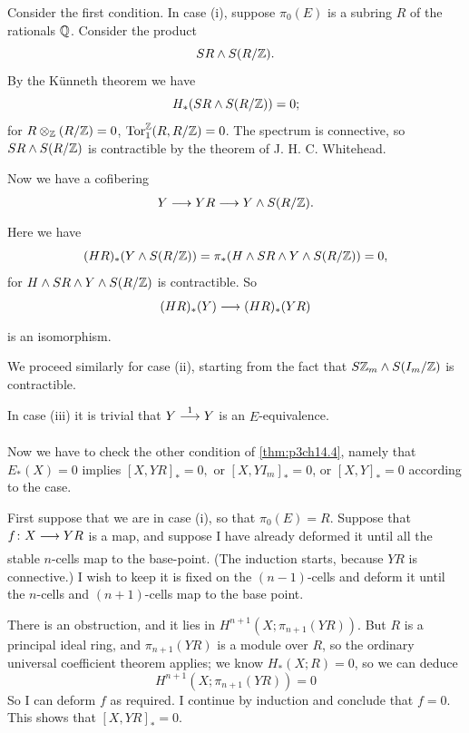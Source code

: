 \documentclass[../main]{subfiles}
\begin{document}
Consider the first condition. In case (i), suppose $\pi_{0}(E)$ is a subring $R$ of the rationals $\mathbb{Q}$. Consider the product 
 \[
  SR \wedge S(R/\mathbb{Z}).
\] 
By the K\"unneth theorem we have 
\[
  H_{\ast}(SR \wedge S(R/\mathbb{Z}))=0;
\] 
for $R \otimes_{\mathbb{Z}}(R/\mathbb{Z})=0$, $\mathrm{Tor}^{\mathbb{Z}}_{1}(R,R/\mathbb{Z})=0$. The spectrum is connective, so $SR \wedge S(R/\mathbb{Z})$ is contractible by the theorem of J. H. C. Whitehead.

Now we have a cofibering 
\[
  Y \lar{} YR \lar{} Y \wedge S(R/\bZ).
\] 
Here we have 
\[
  (HR)_{\ast}(Y \wedge S(R/\mathbb{Z}))=\pi_{\ast}(H \wedge SR \wedge Y \wedge S(R/\mathbb{Z}))=0,
\] 
for $H \wedge SR \wedge Y \wedge S(R/\mathbb{Z})$ is contractible. So
\[
(HR)_{\ast}(Y) \lar{} (HR)_{\ast}(YR)
\] 
is an isomorphism. 

We proceed similarly for case (ii), starting from the fact that $S\mathbb{Z}_m \wedge S(I_m/\mathbb{Z})$ is contractible.

In case (iii) it is trivial that $Y \vra{1} Y $ is an $E$-equivalence.

Now we have to check the other condition of \ref{thm:p3ch14.4}, namely that $E_{\ast}(X)=0$ implies $\left[X,YR\right]_{\ast}=0,$ or $\left[X,YI_{m}\right]_{\ast}=0$, or $\left[X,Y\right]_{\ast}=0$ according to the case.

First suppose that we are in case (i), so that $\pi_{0}(E)=R$. Suppose that $f\colon  X \lar{}  YR $ is a map, and suppose I have already deformed it until all the stable $n$-cells map to the base-point. (The induction starts, because $YR$ is connective.) I wish to keep it is fixed on the $(n-1)$-cells and deform it until the $n$-cells and $(n+1)$-cells map to the base point.

There is an obstruction, and it lies in $H^{n+1}(X;\pi_{n+1}(YR))$. But $R$ is a principal ideal ring, and $\pi_{n+1}(YR)$ is a module over $R$, so the ordinary universal coefficient theorem applies; we know $H_{\ast}(X;R)=0$, so we can deduce 
\[
H^{n+1}(X;\pi_{n+1}(YR))=0
\] 
So I can deform $f$ as required. I continue by induction and conclude that $f=0.$ This shows that  $\left[X,YR\right]_{\ast}=0$.
\end{document}
